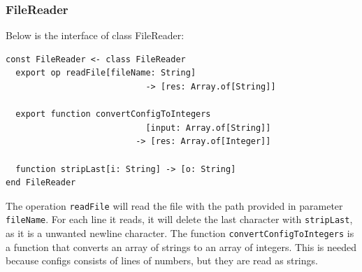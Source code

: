 

\subsubsection{FileReader}
Below is the interface of class FileReader:
\begin{lstlisting}[language=emerald]
const FileReader <- class FileReader
  export op readFile[fileName: String] 
                            -> [res: Array.of[String]]
                            
  export function convertConfigToIntegers
                            [input: Array.of[String]] 
                          -> [res: Array.of[Integer]]
                            
  function stripLast[i: String] -> [o: String]
end FileReader
\end{lstlisting}
The operation \verb|readFile| will read the file with the path provided in parameter \verb|fileName|. For each line it reads, it will delete the last character with \verb|stripLast|, as it is a unwanted newline character. The function \verb|convertConfigToIntegers| is a function that converts an array of strings to an array of integers. This is needed because configs consists of lines of numbers, but they are read as strings.



